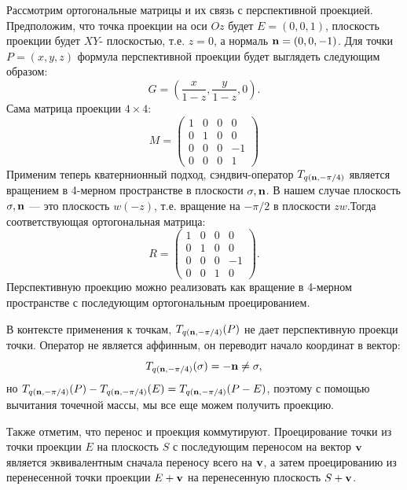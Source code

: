 Рассмотрим ортогональные матрицы и их связь с перспективной проекцией. Предположим, что точка проекции на оси $Oz$ будет $E = (0, 0, 1)$, плоскость проекции будет $XY$- плоскостью, т.е. $z=0$, а нормаль $\vb{n} = (0, 0, -1)$.
Для точки $P = (x,y,z)$ формула перспективной проекции будет выглядеть следующим образом:
\begin{equation*}
    G = \left( \frac{x}{1-z}, \frac{y}{1-z}, 0 \right).
\end{equation*}
Сама матрица проекции $4\times 4$:
\begin{equation*}
    M = \begin{pmatrix}
        1 & 0 & 0 & 0 \\
        0 & 1 & 0 & 0 \\
        0 & 0 & 0 & -1 \\
        0 & 0 & 0 & 1
        \end{pmatrix}
\end{equation*}
Применим теперь кватернионный подход, сэндвич-оператор $T_{q(\vb{n}, -\pi/4)}$ является вращением в 4-мерном пространстве в плоскости $\sigma, \vb{n}$. В нашем случае плоскость $\sigma, \vb{n}$ --- это плоскость $w(-z)$, т.е. вращение на $-\pi/2$ в плоскости $zw$.Тогда соответствующая ортогональная матрица:
\begin{equation*}
    R = \begin{pmatrix}
        1 & 0 & 0 & 0 \\
        0 & 1 & 0 & 0 \\
        0 & 0 & 0 & -1 \\
        0 & 0 & 1 & 0
        \end{pmatrix}.
\end{equation*}
Перспективную проекцию можно реализовать как вращение в 4-мерном пространстве с последующим ортогональным проецированием.

В контексте применения к точкам, $T_{q(\vb{n}, -\pi/4)}(P)$ не дает перспективную проекци точки. Оператор не является аффинным, он переводит начало координат в вектор:
\begin{equation*}
    T_{q(\vb{n}, -\pi/4)}(\sigma) = -\vb{n} \neq \sigma,
\end{equation*}
но $T_{q(\vb{n}, -\pi/4)}(P) - T_{q(\vb{n}, -\pi/4)}(E) = T_{q(\vb{n}, -\pi/4)}(P - E)$, поэтому с помощью вычитания точечной массы, мы все еще можем получить проекцию.

Также отметим, что перенос и проекция коммутируют. Проецирование точки из точки проекции $E$ на плоскость $S$ с последующим переносом на вектор $\vb{v}$ является эквивалентным сначала переносу всего на $\vb{v}$, а затем проецированию из перенесенной точки проекции $E + \vb{v}$ на перенесенную плоскость $S + \vb{v}$.

